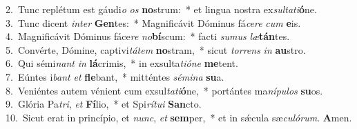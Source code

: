 {2.~}Tunc replétum est gáudi\textit{o} \textit{os} \textbf{no}strum:~* et lingua nostra ex\textit{sul}\textit{ta}\textit{ti}\textbf{ó}ne.\\
{3.~}Tunc dicent \textit{in}\textit{ter} \textbf{Gen}tes:~* Magnificávit Dóminus fá\textit{ce}\textit{re} \textit{cum} \textbf{e}is.\\
{4.~}Magnificávit Dóminus fáce\textit{re} \textit{no}\textbf{bí}scum:~* facti \textit{su}\textit{mus} \textit{læ}\textbf{tán}tes.\\
{5.~}Convérte, Dómine, captivi\textit{tá}\textit{tem} \textbf{no}stram,~* sicut \textit{tor}\textit{rens} \textit{in} \textbf{au}stro.\\
{6.~}Qui sémi\textit{nant} \textit{in} \textbf{lá}crimis,~* in exsulta\textit{ti}\textit{ó}\textit{ne} \textbf{me}tent.\\
{7.~}Eúntes i\textit{bant} \textit{et} \textbf{fle}bant,~* mitténtes \textit{sé}\textit{mi}\textit{na} \textbf{su}a.\\
{8.~}Veniéntes autem vénient cum exsul\textit{ta}\textit{ti}\textbf{ó}ne,~* portántes ma\textit{ní}\textit{pu}\textit{los} \textbf{su}os.\\
{9.~}Glória Pa\textit{tri}, \textit{et} \textbf{Fí}lio,~* et Spi\textit{rí}\textit{tu}\textit{i} \textbf{San}cto.\\
{10.~}Sicut erat in princípio, et \textit{nunc}, \textit{et} \textbf{sem}per,~* et in sǽcula sæ\textit{cu}\textit{ló}\textit{rum}. \textbf{A}men.\\
